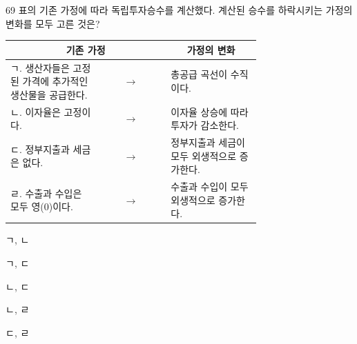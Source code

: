 \begin{question}{69}
표의 기존 가정에 따라 독립투자승수를 계산했다. 계산된 승수를 하락시키는 가정의 변화를 모두 고른 것은?
\par{\small\centering
\begin{tabular}{|p{0.36\linewidth}|c|p{0.36\linewidth}|}\hline
\multicolumn{2}{|c|}{기존 가정} & \multicolumn{1}{c|}{가정의 변화} \\ \hline
ㄱ. 생산자들은 고정된 가격에 추가적인 생산물을 공급한다. & $\to$ & 총공급 곡선이 수직이다. \\ \hline
ㄴ. 이자율은 고정이다. & $\to$ & 이자율 상승에 따라 투자가 감소한다. \\ \hline
ㄷ. 정부지출과 세금은 없다. & $\to$ & 정부지출과 세금이 모두 외생적으로 증가한다. \\ \hline
ㄹ. 수출과 수입은 모두 영(0)이다. & $\to$ & 수출과 수입이 모두 외생적으로 증가한다. \\ \hline
\end{tabular}\par}
\begin{choices}
  \item ㄱ, ㄴ
  \item ㄱ, ㄷ
  \item ㄴ, ㄷ
  \item ㄴ, ㄹ
  \item ㄷ, ㄹ
\end{choices}
\end{question}
